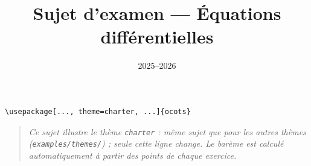 \documentclass[11pt]{ocots-exam}
\title{Sujet d'examen --- Équations différentielles}
\date{2025--2026}
\begin{document}
\maketitle

\begin{lstlisting}
\usepackage[..., theme=charter, ...]{ocots}
\end{lstlisting}
\begin{quote}\itshape
Ce sujet illustre le th\`eme \texttt{charter} : m\^eme sujet que pour les
autres th\`emes (\texttt{examples/themes/}) ; seule cette ligne change.
Le bar\`eme est calcul\'e automatiquement \`a partir des points de chaque
exercice.
\end{quote}

\medskip

\end{document}

